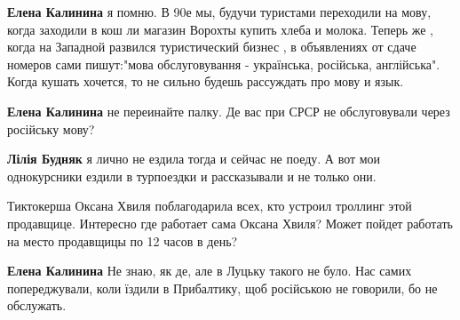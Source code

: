 \begin{itemize}
\begin{itemize}
 
\textbf{Елена Калинина} я помню. В 90е мы, будучи туристами переходили на мову, когда заходили в кош ли магазин Ворохты купить хлеба и молока.
Теперь же , когда на Западной развился туристический бизнес , в объявлениях от сдаче номеров сами пишут:"мова обслуговування - українська, російська, англійська". Когда кушать хочется, то не сильно будешь рассуждать про мову и язык.

 
\textbf{Елена Калинина} не переинайте палку. Де вас при СРСР не обслуговували через російську мову?

 
\textbf{Лілія Будняк} я лично не ездила тогда и сейчас не поеду. А вот мои однокурсники ездили в турпоездки и рассказывали и не только они.

 
Тиктокерша Оксана Хвиля поблагодарила всех, кто устроил троллинг этой продавщице. Интересно где работает сама Оксана Хвиля? Может пойдет работать на место продавщицы по 12 часов в день?

 
\textbf{Елена Калинина}
Не знаю, як де, але в Луцьку такого не було. Нас самих попереджували, коли
їздили в Прибалтику, щоб російською не говорили, бо не обслужать.


\end{itemize}
\end{itemize}
